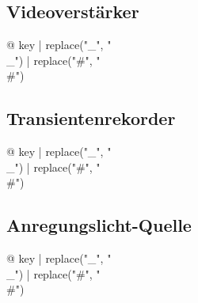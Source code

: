\begin{multicols}{2}
\subsection{Videoverstärker}

\begin{description}
\item[{@ key | replace("_", "\\_") | replace("#", "\\#") }] %
\end{description}

\subsection{Transientenrekorder}

\begin{description}
\item[{@ key | replace("_", "\\_") | replace("#", "\\#") }] %
\end{description}

\subsection{Anregungslicht-Quelle}

\begin{description}
\item[{@ key | replace("_", "\\_") | replace("#", "\\#") }] %
\end{description}


\end{multicols}

